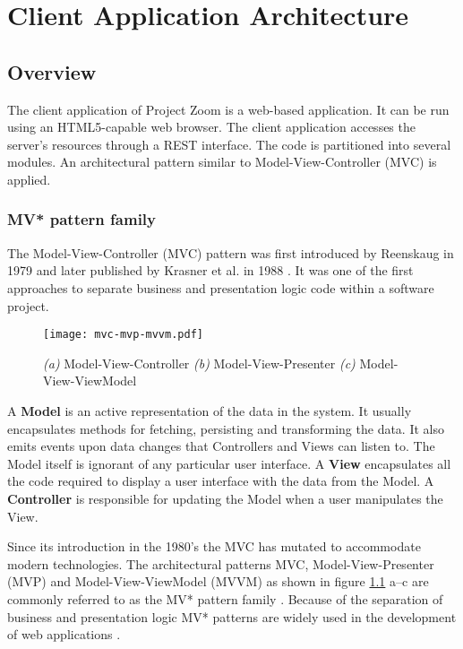 \chapter{Client Application Architecture}

\section{Overview}
The client application of Project Zoom is a web-based application. It can be run using an HTML5-capable web browser. The client application accesses the server's resources through a REST interface. The code is partitioned into several modules. An architectural pattern similar to Model-View-Controller (MVC) is applied.

\subsection{MV* pattern family}
The Model-View-Controller (MVC) pattern was first introduced by Reenskaug in 1979 \cite{Reenskaug_1979} and later published by Krasner et al. in 1988 \cite{Krasner_1988}. It was one of the first approaches to separate business and presentation logic code within a software project.

\begin{figure}
\texttt{[image: mvc-mvp-mvvm.pdf]}
\caption[Diagrams of Model-View-Controller, Model-View-Presenter and Model-View-ViewModel]{\textit{(a)} Model-View-Controller \textit{(b)} Model-View-Presenter \textit{(c)} Model-View-ViewModel}
\label{fig:MV}
\end{figure}

A \textbf{Model} is an active representation of the data in the system. It usually encapsulates methods for fetching, persisting and transforming the data. It also emits events upon data changes that Controllers and Views can listen to. The Model itself is ignorant of any particular user interface. A \textbf{View} encapsulates all the code required to display a user interface with the data from the Model. A \textbf{Controller} is responsible for updating the Model when a user manipulates the View. \cite{Krasner_1988} \cite{Gamma_1994}

Since its introduction in the 1980's the MVC has mutated to accommodate modern technologies. The architectural patterns MVC, Model-View-Presenter (MVP) and Model-View-ViewModel (MVVM) as shown in figure \ref{fig:MV} a–c are commonly referred to as the MV* pattern family \cite{Osmani_2012}. Because of the separation of business and presentation logic MV* patterns are widely used in the development of web applications \cite{Takada_2012}.

